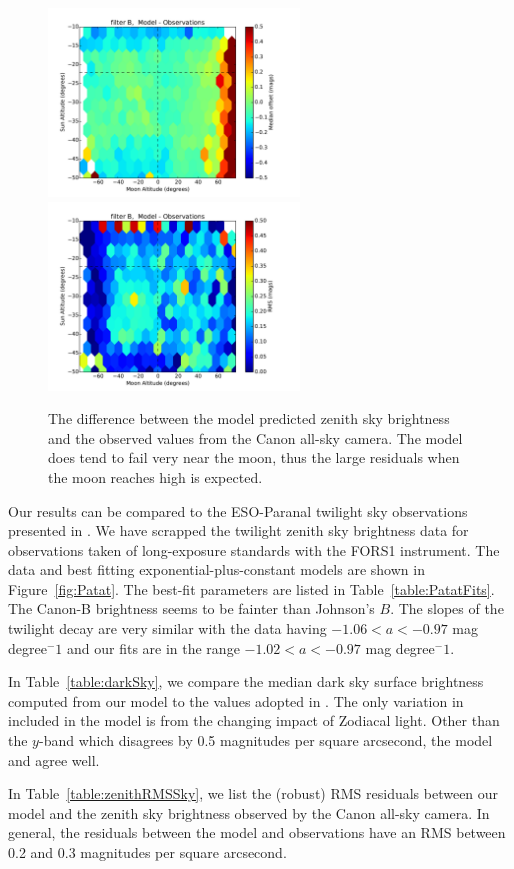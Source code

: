 \documentclass[]{spie}
\begin{document}
\begin{figure}
  \includegraphics[height=5cm]{plots/zenithMedian_B_.pdf}\includegraphics[height=5cm]{plots/zenithRMS_B_.pdf}
  \caption{ The difference between the model predicted zenith sky brightness and the observed values from the Canon all-sky camera.  The model does tend to fail very near the moon, thus the large residuals when the moon reaches high is expected.  \label{fig:zenithModel}}
\end{figure}


Our results can be compared to the ESO-Paranal twilight sky observations presented in \cite{Patat06}. We have scrapped the twilight zenith sky brightness data for observations taken of long-exposure standards with the FORS1 instrument.  The data and best fitting exponential-plus-constant models are shown in Figure~\ref{fig:Patat}.  The best-fit parameters are listed in Table~\ref{table:PatatFits}.  The Canon-B brightness seems to be fainter than Johnson's $B$.  The slopes of the twilight decay are very similar with the \cite{Patat06} data having $ -1.06  < a < -0.97 $ mag degree$^-1$ and our fits are in the range $ -1.02 < a < -0.97$ mag degree$^-1$.


In Table~\ref{table:darkSky}, we compare the median dark sky surface brightness computed from our model to the values adopted in \cite{Ivezic08}.  The only variation in included in the model is from the changing impact of Zodiacal light.  Other than the $y$-band which disagrees by 0.5 magnitudes per square arcsecond, the model and \cite{Ivezic08} agree well. 

In Table~\ref{table:zenithRMSSky}, we list the (robust) RMS residuals between our model and the zenith sky brightness observed by the Canon all-sky camera. In general, the residuals between the model and observations have an RMS between 0.2 and 0.3 magnitudes per square arcsecond.  
\end{document}
